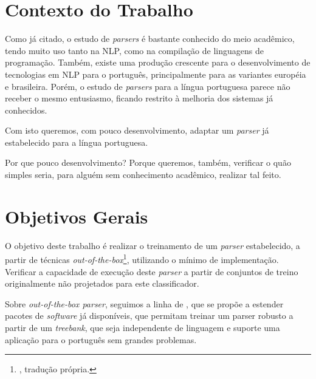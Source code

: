     
\section{Contexto do Trabalho}
\label{sec:contexto}

Como já citado, o estudo de \textit{parsers} é bastante conhecido do meio acadêmico, tendo muito uso tanto na NLP, como na compilação de linguagens de programação. Também, existe uma produção crescente para o desenvolvimento de tecnologias em NLP para o português, principalmente para as variantes européia e brasileira. Porém, o estudo de \textit{parsers} para a língua portuguesa parece não receber o mesmo entusiasmo, ficando restrito à melhoria dos sistemas já conhecidos.

Com isto queremos, com pouco desenvolvimento, adaptar um \textit{parser} já estabelecido para a língua portuguesa. 

Por que pouco desenvolvimento? Porque queremos, também, verificar o quão simples seria, para alguém sem conhecimento acadêmico, realizar tal feito.


\section{Objetivos Gerais}
\label{sec:objetivos-gerais}

O objetivo deste trabalho é realizar o treinamento de um \textit{parser} estabelecido, a partir de técnicas \textit{out-of-the-box}\footnote{, tradução própria.}, utilizando o mínimo de implementação. Verificar a capacidade de execução deste \textit{parser} a partir de conjuntos de treino originalmente não projetados para este classificador.

Sobre \textit{out-of-the-box parser}, seguimos a linha de , que se propõe a estender pacotes de \textit{software} já disponíveis, que permitam treinar um parser robusto a partir de um \textit{treebank}, que seja independente de linguagem e suporte uma aplicação para o português sem grandes problemas.

